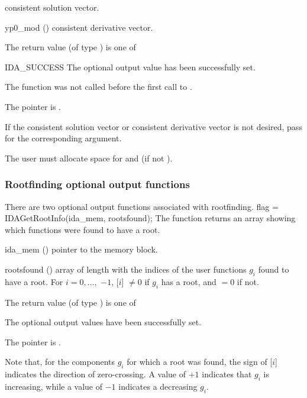 {{\begin{args}[yy0\_mod]
    consistent solution vector.
  \item[yp0\_mod] ()
    consistent derivative vector.
  \end{args}
}
{
  The return value  (of type ) is one of
  \begin{args}
  \item[IDA\_SUCCESS] 
    The optional output value has been successfully set.
  \item[\Id{IDA\_ILL\_INPUT}]
    The function was not called before the first call to .
  \item[\Id{IDA\_MEM\_NULL}]
    The  pointer is .
  \end{args}
}
{
  If the consistent solution vector or consistent derivative vector
  is not desired, pass  for the corresponding argument.

  {\warn} The user must allocate space for  and 
  (if not ).
}

\subsubsection{Rootfinding optional output functions}\label{sss:optout_root}
There are two optional output functions associated with rootfinding.
{
  flag = IDAGetRootInfo(ida\_mem, rootsfound);
}
{
  The function  returns an array showing which 
  functions were found to have a root.
}
{
  \begin{args}
  \item[ida\_mem] ()
    pointer to the {\ida} memory block.
  \item[rootsfound] ()
    array of length  with the indices of the user functions $g_i$ found
    to have a root.  For $i = 0,\ldots, $ $-1$,
   [$i$] $\ne 0$ if $g_i$ has a root, and $ = 0$ if not.
  \end{args}
}
{
  The return value  (of type ) is one of
  \begin{args}
  \item[\Id{IDA\_SUCCESS}] 
    The optional output values have been successfully set.
  \item[\Id{IDA\_MEM\_NULL}]
    The  pointer is .
  \end{args}
}
{
  Note that, for the components $g_i$ for which a root was found,
  the sign of [$i$] indicates the direction of
  zero-crossing. A value of $+1$ indicates that $g_i$ is increasing,
  while a value of $-1$ indicates a decreasing $g_i$.

}}
